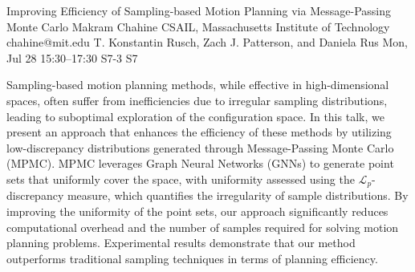 \begin{talk}
  {Improving Efficiency of Sampling-based Motion Planning via Message-Passing Monte Carlo}%
  {Makram Chahine}%
  {CSAIL, Massachusetts Institute of Technology}%
  {chahine@mit.edu}%
  {T. Konstantin Rusch, Zach J. Patterson, and Daniela Rus}%
  {}%
  {Mon, Jul 28 15:30–17:30}%
  {S7-3}%
  {S7}%
  
				
			
Sampling-based motion planning methods, while effective in high-dimensional spaces, often suffer from inefficiencies due to irregular sampling distributions, leading to suboptimal exploration of the configuration space. In this talk, we present an approach that enhances the efficiency of these methods by utilizing low-discrepancy distributions generated through Message-Passing Monte Carlo (MPMC). MPMC leverages Graph Neural Networks (GNNs) to generate point sets that uniformly cover the space, with uniformity assessed using the $\mathcal{L}_p$-discrepancy measure, which quantifies the irregularity of sample distributions. By improving the uniformity of the point sets, our approach significantly reduces computational overhead and the number of samples required for solving motion planning problems. Experimental results demonstrate that our method outperforms traditional sampling techniques in terms of planning efficiency.

\medskip


\end{talk}

